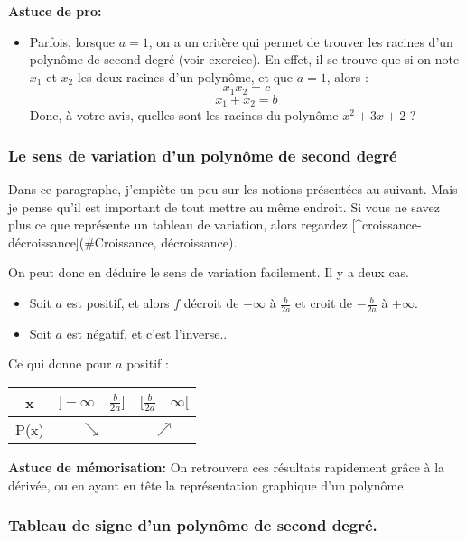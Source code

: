 \documentclass[french,]{article}
\providecommand{\tightlist}{%
  \setlength{\itemsep}{0pt}\setlength{\parskip}{0pt}}
\begin{document}
\textbf{Astuce de pro:}

\begin{itemize}
\tightlist
\item
  Parfois, lorsque \(a =1\), on a un critère qui permet de trouver les
  racines d'un polynôme de second degré (voir exercice). En effet, il se
  trouve que si on note \(x_1\) et \(x_2\) les deux racines d'un
  polynôme, et que \(a=1\), alors : \[ x_1 x_2 = c\] \[ x_1 + x_2 = b\]
  Donc, à votre avis, quelles sont les racines du polynôme
  \(x^2 + 3x +2\) ?
\end{itemize}

\hypertarget{le-sens-de-variation-dun-polynuxf4me-de-second-degruxe9}{%
\subsubsection{Le sens de variation d'un polynôme de second
degré}\label{le-sens-de-variation-dun-polynuxf4me-de-second-degruxe9}}

Dans ce paragraphe, j'empiète un peu sur les notions présentées au
suivant. Mais je pense qu'il est important de tout mettre au même
endroit. Si vous ne savez plus ce que représente un tableau de
variation, alors regardez
{[}\^{}croissance-décroissance{]}(\#Croissance, décroissance).

On peut donc en déduire le sens de variation facilement. Il y a deux
cas.

\begin{itemize}
\tightlist
\item
  Soit \(a\) est positif, et alors \(f\) décroit de \(-\infty\) à
  \(\frac{b}{2a}\) et croit de \(-\frac{b}{2a}\) à \(+ \infty\).
\item
  Soit \(a\) est négatif, et c'est l'inverse..
\end{itemize}

Ce qui donne pour \(a\) positif :

\begin{longtable}[]{@{}ccc@{}}
\toprule
x & \(]-\infty \quad \frac{b}{2a}]\) &
\([\frac{b}{2a} \quad \infty[\)\tabularnewline
\midrule
\endhead
P(x) & \(\searrow\) & \(\nearrow\)\tabularnewline
\bottomrule
\end{longtable}

\textbf{Astuce de mémorisation:} On retrouvera ces résultats rapidement
grâce à la dérivée, ou en ayant en tête la représentation graphique d'un
polynôme.

\hypertarget{tableau-de-signe-dun-polynuxf4me-de-second-degruxe9.}{%
\subsubsection{Tableau de signe d'un polynôme de second
degré.}\label{tableau-de-signe-dun-polynuxf4me-de-second-degruxe9.}}
\end{document}
